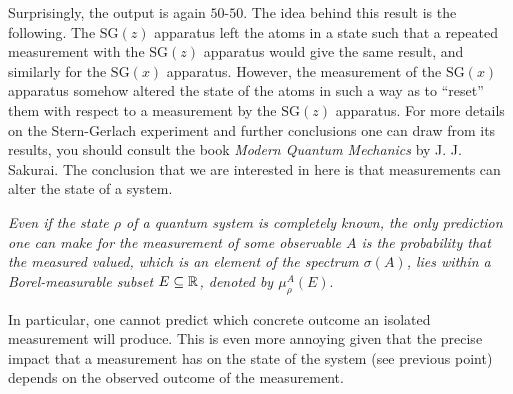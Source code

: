 \begin{center}
\end{center}
Surprisingly, the output is again $50$-$50$. The idea behind this result is the following. The $\mathrm{SG}(z)$ apparatus left the atoms in a state such that a repeated measurement with the $\mathrm{SG}(z)$ apparatus would give the same result, and similarly for the $\mathrm{SG}(x)$ apparatus. However, the measurement of the $\mathrm{SG}(x)$ apparatus somehow altered the state of the atoms in such a way as to ``reset'' them with respect to a measurement by the $\mathrm{SG}(z)$ apparatus. For more details on the Stern-Gerlach experiment and  further conclusions one can draw from its results, you should consult the book \textit{Modern Quantum Mechanics} by J. J. Sakurai. The conclusion that we are interested in here is that measurements can alter the state of a system.

\item \textit{Even if the state $\rho$ of a quantum system is completely known, the only prediction one can make for the measurement of some observable $A$ is the probability that the measured valued, which is an element of the spectrum $\sigma(A)$, lies within a Borel-measurable subset $E\subseteq \mathbb{R}$, denoted by
$\mu^A_{\rho}(E)$}.

In particular, one cannot predict which concrete outcome an isolated measurement will produce. This is even more annoying given that the precise impact that a measurement has on the state of the system (see previous point) depends on the observed outcome of the measurement.
\een

